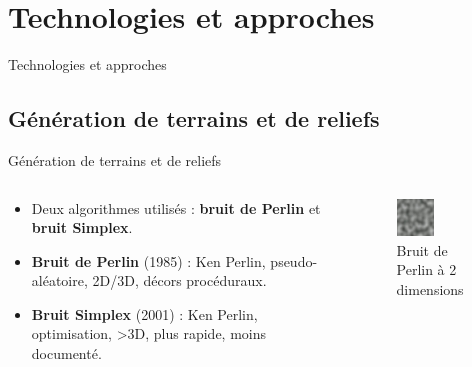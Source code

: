 \documentclass[aspectratio=169]{beamer}
\begin{document}
\section{Technologies et approches}

\begin{frame}{Technologies et approches}
    \tableofcontents[sections={2}]
\end{frame}

\subsection{Génération de terrains et de reliefs}

\begin{frame}{Génération de terrains et de reliefs}
    \begin{columns}
        \centering
        \begin{column}{0.5\textwidth}
            \centering
            \begin{itemize}
                \item Deux algorithmes utilisés : \textbf{bruit de Perlin} et \textbf{bruit Simplex}.
                \item \textbf{Bruit de Perlin} (1985) : Ken Perlin, pseudo-aléatoire, 2D/3D, décors procéduraux.
                \item \textbf{Bruit Simplex} (2001) : Ken Perlin, optimisation, >3D, plus rapide, moins documenté.
            \end{itemize}
        \end{column}
        \begin{column}{0.5\textwidth}
            \centering
            \begin{figure}
                \centering
                \captionsetup{format=sanslabel}
                \includegraphics[width=0.5\textwidth]{assets/Perlin_noise.jpg}
                \caption{Bruit de Perlin à 2 dimensions}
            \end{figure}
        \end{column}
    \end{columns}
\end{frame}
\end{document}
